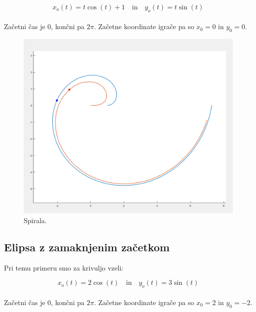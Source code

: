 \documentclass[mat1,reqno]{fmfdelo}
\begin{document}
\begin{equation*}
x_{o}(t) = t\cos(t) + 1 \quad \textrm{in} \quad
y_{o}(t) = t\sin(t)
\end{equation*}
\\
Začetni čas je $0$, končni pa $2\pi$. Začetne koordinate igrače pa so $x_{0} = 0$ in $y_{0} = 0$.

\begin{figure}[!h]
\centering
\includegraphics[scale=0.2]{Spirala}\\
Spirala.
\end{figure}


\subsection{Elipsa z zamaknjenim začetkom} Pri temu primeru smo za krivuljo vzeli:

\begin{equation*}
x_{o}(t) = 2\cos(t) \quad \textrm{in} \quad
y_{o}(t) = 3\sin(t)
\end{equation*}
\\
Začetni čas je $0$, končni pa $2\pi$. Začetne koordinate igrače pa so $x_{0} = 2$ in $y_{0} = -2$.
\end{document}
